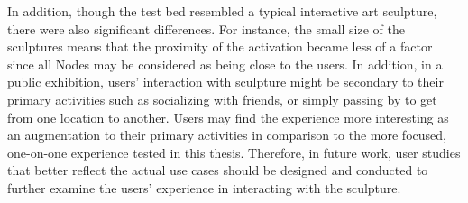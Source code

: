 In addition, though the test bed resembled a typical interactive art sculpture, there were also significant differences. For instance, the small size of the sculptures means that the proximity of the activation became less of a factor since all Nodes may be considered as being close to the users. In addition, in a public exhibition, users' interaction with sculpture might be secondary to their primary activities such as socializing with friends, or simply passing by to get from one location to another. Users may find the experience more interesting as an augmentation to their primary activities in comparison to the more focused, one-on-one experience tested in this thesis. Therefore, in future work, user studies that better reflect the actual use cases should be designed and conducted to further examine the users' experience in interacting with the sculpture.
